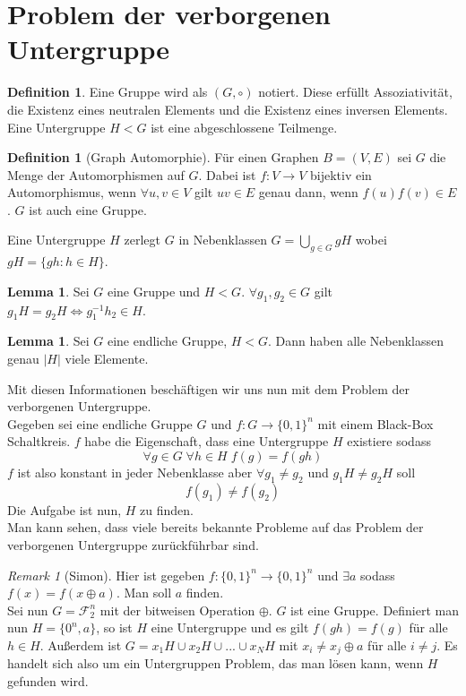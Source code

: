 \documentclass[a4paper, 12pt]{article}
\theoremstyle{plain}
\theoremstyle{definition}
\newtheorem{definition}[theorem]{Definition} %
\theoremstyle{lemma}
\newtheorem{lemma}[theorem]{Lemma}
\theoremstyle{remark}
\newtheorem{remark}[theorem]{Remark}
\theoremstyle{example}
\begin{document}
\section{Problem der verborgenen Untergruppe}
	\begin{definition}
		Eine Gruppe wird als $(G,\circ)$ notiert. Diese erfüllt Assoziativität, die Existenz eines neutralen Elements und die Existenz eines inversen Elements. Eine Untergruppe $H<G$ ist eine abgeschlossene Teilmenge.
	\end{definition}
	\begin{definition}[Graph Automorphie]
		Für einen Graphen $B = (V,E)$ sei $G$ die Menge der Automorphismen auf $G$. Dabei ist $f: V \to V$ bijektiv ein Automorphismus, wenn $\forall u,v \in V$ gilt $uv \in E$ genau dann, wenn $f(u)f(v) \in E$. $G$ ist auch eine Gruppe.
	\end{definition}
	\noindent Eine Untergruppe $H$ zerlegt $G$ in Nebenklassen $G = \bigcup_{g \in G} gH$ wobei $gH = \{gh : h \in H\}$.
	\begin{lemma}
		Sei $G$ eine Gruppe und $H<G$. $\forall g_1,g_2 \in G$ gilt $g_1H = g_2H \Leftrightarrow g_1^{-1}h_2 \in H$.
	\end{lemma}
	\begin{lemma}
		Sei $G$ eine endliche Gruppe, $H<G$. Dann haben alle Nebenklassen genau $\left|H\right|$ viele Elemente.
	\end{lemma}
	Mit diesen Informationen beschäftigen wir uns nun mit dem Problem der verborgenen Untergruppe.\\
	Gegeben sei eine endliche Gruppe $G$ und $f:G \to \{0,1\}^n$ mit einem Black-Box Schaltkreis. $f$ habe die Eigenschaft, dass eine Untergruppe $H$ existiere sodass \[\forall g \in G\; \forall h \in H\; f(g) = f(gh)\] $f$ ist also konstant in jeder Nebenklasse aber $\forall g_1 \neq g_2$ und $g_1H \neq g_2H$ soll \[f(g_1) \neq f(g_2)\] Die Aufgabe ist nun, $H$ zu finden.\\
	Man kann sehen, dass viele bereits bekannte Probleme auf das Problem der verborgenen Untergruppe zurückführbar sind.
	\begin{remark}[Simon]
		Hier ist gegeben $f:\{0,1\}^n \to \{0,1\}^n$ und $\exists a$ sodass $f(x) = f(x\oplus a)$. Man soll $a$ finden.\\
		Sei nun $G = \mathcal{F}_2^n$ mit der bitweisen Operation $\oplus$. $G$ ist eine Gruppe. Definiert man nun $H = \{0^n,a\}$, so ist $H$ eine Untergruppe und es gilt $f(gh) = f(g)$ für alle $h \in H$. Außerdem ist $G = x_1H \cup x_2H \cup ... \cup x_NH$ mit $x_i \neq x_j \oplus a$ für alle $i \neq j$. Es handelt sich also um ein Untergruppen Problem, das man lösen kann, wenn $H$ gefunden wird.
	\end{remark}
\end{document}
